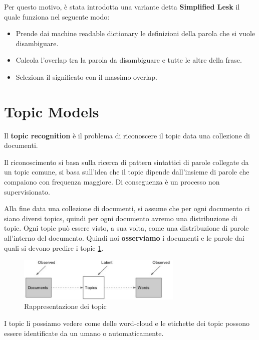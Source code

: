 Per questo motivo, è stata introdotta una variante detta \textbf{Simplified Lesk}
il quale funziona nel seguente modo:
\begin{itemize}
      \item Prende dai machine readable dictionary le definizioni della parola
            che si vuole disambiguare.
      \item Calcola l'overlap tra la parola da disambiguare e tutte le altre
            della frase.
      \item Seleziona il significato con il massimo overlap.
\end{itemize}
\section{Topic Models}
\begin{definizione}
      Il \textbf{topic recognition} è il problema di riconoscere il topic data una 
      collezione di documenti.
\end{definizione}

Il riconoscimento si basa sulla ricerca di pattern sintattici di parole collegate 
da un topic comune, si basa sull'idea che il topic dipende dall'insieme di parole 
che compaiono con frequenza maggiore. Di conseguenza è un processo non supervisionato.

Alla fine data una collezione di documenti, si assume che per ogni documento ci siano 
diversi topics, quindi per ogni documento avremo una distribuzione di topic.
Ogni topic può essere visto, a sua volta, come una distribuzione di parole all'interno 
del documento. Quindi noi \textbf{osserviamo} i documenti e le parole dai quali 
si devono predire i topic \ref{fig:topic}.

\begin{figure}[!ht]
      \centering
      \includegraphics[width=0.7\textwidth]{img/nlp/topic_model.png}
      \caption{Rappresentazione dei topic}
      \label{fig:topic}
\end{figure}

\begin{nota}
      I topic li possiamo vedere come delle word-cloud e le etichette dei topic 
      possono essere identificate da un umano o automaticamente.
\end{nota}

